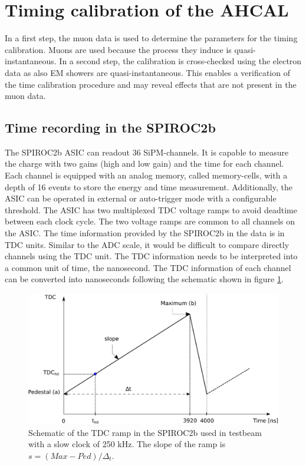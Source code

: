 \documentclass{JINST}
\begin{document}
\section{Timing calibration of the AHCAL}

In a first step, the muon data is used to determine the parameters for the timing calibration. Muons are used because the process they induce is quasi-instantaneous. In a second step, the calibration is cross-checked using the electron data as also EM showers are quasi-instantaneous. This enables a verification of the time calibration procedure and may reveal effects that are not present in the muon data.

\subsection{Time recording in the SPIROC2b}

The SPIROC2b ASIC can readout 36 SiPM-channels. It is capable to measure the charge with two gains (high and low gain) and the time for each channel. Each channel is equipped with an analog memory, called memory-cells, with a depth of 16 events to store the energy and time measurement. Additionally, the ASIC can be operated in external or auto-trigger mode with a configurable threshold. The ASIC has two multiplexed TDC voltage ramps to avoid deadtime between each clock cycle. The two voltage ramps are common to all channels on the ASIC. The time information provided by the SPIROC2b in the data is in TDC units. Similar to the ADC scale, it would be difficult to compare directly channels using the TDC unit. The TDC information needs to be interpreted into a common unit of time, the nanosecond. The TDC information of each channel can be converted into nanoseconds following the schematic shown in figure \ref{fig:ConvertTime}.

\begin{figure}[htbp!]
  \centering
  \includegraphics[width=0.9\linewidth]{fig/TDCRamp.eps}
  \caption{Schematic of the TDC ramp in the SPIROC2b used in testbeam with a slow clock of 250 kHz. The slope of the ramp is $s = (Max-Ped)/\Delta_t$.} \label{fig:ConvertTime}
\end{figure}
\end{document}
